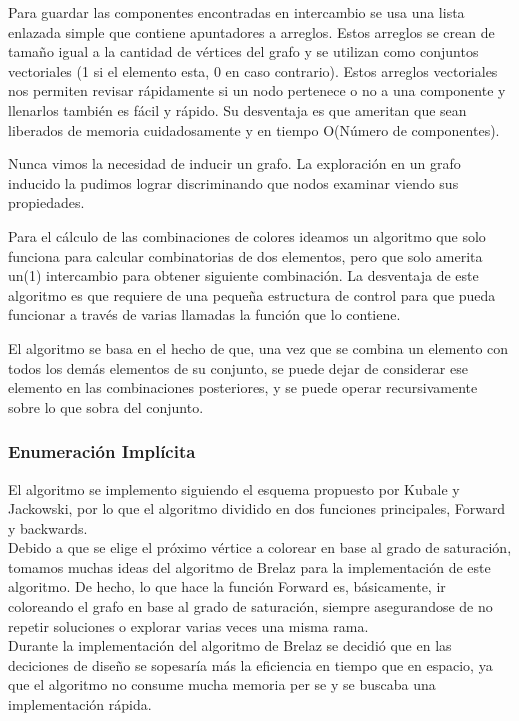 \documentclass[a4paper,10pt]{article}
\begin{document}
Para guardar las componentes encontradas en intercambio se usa una lista
enlazada simple que contiene apuntadores a arreglos. Estos arreglos se
crean de tamaño igual a la cantidad de vértices del grafo y se utilizan
como conjuntos vectoriales (1 si el elemento esta, 0 en caso
contrario). Estos arreglos vectoriales nos permiten revisar rápidamente
si un nodo pertenece o no a una componente y llenarlos también es fácil
y rápido. Su desventaja es que ameritan que sean liberados de memoria
cuidadosamente y en tiempo O(Número de componentes).

Nunca vimos la necesidad de inducir un grafo. La exploración en un grafo
inducido la pudimos lograr discriminando que nodos examinar viendo sus
propiedades.

Para el cálculo de las combinaciones de colores ideamos un algoritmo que
solo funciona para calcular combinatorias de dos elementos, pero que
solo amerita un(1) intercambio para obtener siguiente combinación. La
desventaja de este algoritmo es que requiere de una pequeña estructura
de control para que pueda funcionar a través de varias llamadas la
función que lo contiene.

El algoritmo se basa en el hecho de que, una vez que se combina un
elemento con todos los demás elementos de su conjunto, se puede dejar de
considerar ese elemento en las combinaciones posteriores, y se puede
operar recursivamente sobre lo que sobra del conjunto.


\subsubsection{Enumeración Implícita}
El algoritmo se implemento siguiendo el esquema propuesto por Kubale y
Jackowski, por lo que el algoritmo dividido en dos funciones principales,
Forward y backwards.\\

\indent Debido a que se elige el pr\'oximo v\'ertice a colorear en base al grado de
saturaci\'on, tomamos muchas ideas del algoritmo de Brelaz para la
implementaci\'on de este algoritmo. De hecho, lo que hace la funci\'on
Forward es, b\'asicamente, ir coloreando el grafo en base al grado de
saturaci\'on, siempre asegurandose de no repetir soluciones o explorar
varias veces una misma rama.\\

\indent Durante la implementaci\'on del algoritmo de Brelaz se decidi\'o
que en las deciciones de dise\~no se sopesar\'ia m\'as la eficiencia en
tiempo que en espacio, ya que el algoritmo no consume mucha memoria per
se y se buscaba una implementaci\'on r\'apida.\\
\end{document}
